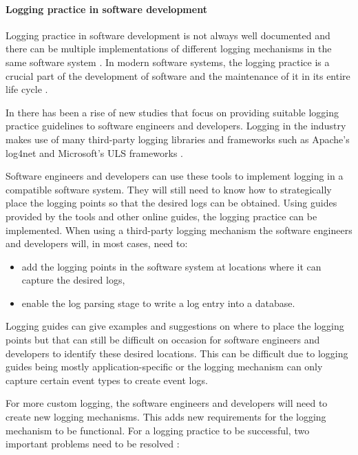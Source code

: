 \paragraph{Logging practice in software development}
Logging practice in software development is not always well documented and there can be multiple implementations of different logging mechanisms in the same software system \cite{Pecchia2015, Kitchenham2007}. In modern software systems, the logging practice is a crucial part of the development of software and the maintenance of it in its entire life cycle \cite{Rong2018}.\par In  there has been a rise of new studies that focus on providing suitable logging practice guidelines to software engineers and developers. Logging in the industry makes use of many third-party logging libraries and frameworks such as Apache's log4net and Microsoft's ULS frameworks \cite{Zhu2015, Rong2018}.\par Software engineers and developers can use these tools to implement logging in a compatible software system. They will still need to know how to strategically place the logging points so that the desired logs can be obtained. Using guides provided by the tools and other online guides, the logging practice can be implemented. When using a third-party logging mechanism the software engineers and developers will, in most cases, need to:

\begin{itemize}
	\item add the logging points in the software system at locations where it can capture the desired logs,
	\item enable the log parsing stage to write a log entry into a database.
\end{itemize}

Logging guides can give examples and suggestions on where to place the logging points but that can still be difficult on occasion for software engineers and developers to identify these desired locations. This can be difficult due to logging guides being mostly application-specific or the logging mechanism can only capture certain event types to create event logs. \par For more custom logging, the software engineers and developers will need to create new logging mechanisms. This adds new requirements for the logging mechanism to be functional. For a logging practice to be successful, two important problems need to be resolved \cite{Zhu2015, Zhu2019, Rong2018}:

